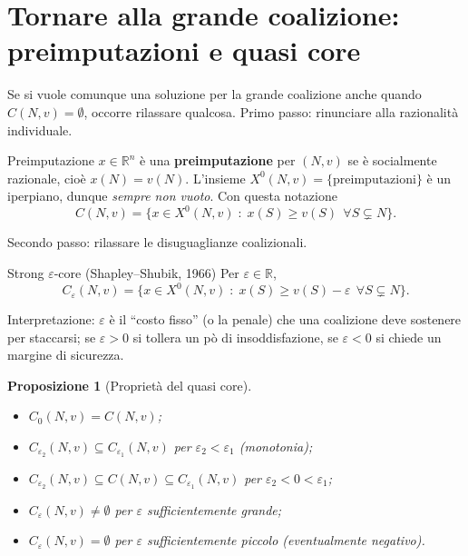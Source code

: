 \documentclass[12pt,a4paper,twoside]{book}
\theoremstyle{plain}
\newtheorem{proposition}[theorem]{Proposizione}
\theoremstyle{definition}
\begin{document}
\section{Tornare alla grande coalizione: preimputazioni e quasi core}

Se si vuole comunque una soluzione per la grande coalizione anche quando
$C(N,v)=\emptyset$, occorre rilassare qualcosa. Primo passo: rinunciare alla
razionalità individuale.

\begin{defbox}{Preimputazione}
$x\in\mathbb{R}^n$ è una \textbf{preimputazione} per $(N,v)$ se è socialmente
razionale, cioè $x(N)=v(N)$. L'insieme
$X^{0}(N,v)=\{\text{preimputazioni}\}$ è un iperpiano, dunque \emph{sempre non
vuoto}. Con questa notazione
\[
  C(N,v)=\{x\in X^{0}(N,v)\;:\;x(S)\ge v(S)\ \ \forall S\subsetneq N\}.
\]
\end{defbox}

Secondo passo: rilassare le disuguaglianze coalizionali.

\begin{defbox}{Strong $\varepsilon$-core (Shapley--Shubik, 1966)}
Per $\varepsilon\in\mathbb{R}$,
\[
  C_{\varepsilon}(N,v)=\{x\in X^{0}(N,v)\;:\;x(S)\ge v(S)-\varepsilon\ \ \forall S\subsetneq N\}.
\]
\end{defbox}

Interpretazione: $\varepsilon$ è il ``costo fisso'' (o la penale) che una
coalizione deve sostenere per staccarsi; se $\varepsilon>0$ si tollera un pò di
insoddisfazione, se $\varepsilon<0$ si chiede un margine di sicurezza.

\begin{proposition}[Proprietà del quasi core]
\begin{itemize}
  \item[(i)] $C_{0}(N,v)=C(N,v)$;
  \item[(ii)] $C_{\varepsilon_2}(N,v)\subseteq C_{\varepsilon_1}(N,v)$ per $\varepsilon_2<\varepsilon_1$ (monotonia);
  \item[(iii)] $C_{\varepsilon_2}(N,v)\subseteq C(N,v)\subseteq C_{\varepsilon_1}(N,v)$ per $\varepsilon_2<0<\varepsilon_1$;
  \item[(iv)] $C_{\varepsilon}(N,v)\ne\emptyset$ per $\varepsilon$ sufficientemente grande;
  \item[(v)] $C_{\varepsilon}(N,v)=\emptyset$ per $\varepsilon$ sufficientemente piccolo (eventualmente negativo).
\end{itemize}
\end{proposition}
\end{document}
